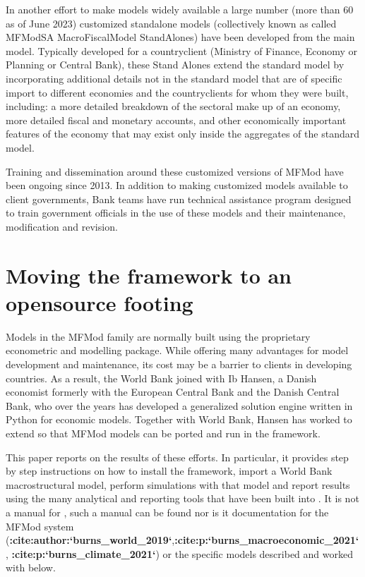 \documentclass[letterpaper,10pt,english]{jupyterBook}
\begin{document}
\sphinxAtStartPar
In another effort to make models widely available a large number (more than 60 as of June 2023) customized stand\sphinxhyphen{}alone models (collectively known as called MFModSA \sphinxhyphen{} MacroFiscalModel StandAlones)  have been developed from the main model. Typically developed for a country\sphinxhyphen{}client (Ministry of Finance, Economy or Planning or Central Bank), these Stand Alones extend the standard model by incorporating additional details not in the standard model that are of specific import to different economies and the country\sphinxhyphen{}clients for whom they were built, including: a more detailed breakdown of the sectoral make up of an economy, more detailed fiscal and monetary accounts, and other economically important features of the economy that may exist only inside the aggregates of the standard model.

\sphinxAtStartPar
Training and dissemination around these customized versions of MFMod have been ongoing since 2013. In addition to making customized models available to client governments, Bank teams have run technical assistance program designed to train government officials in the use of these models and their maintenance, modification and revision.


\section{Moving the framework to an open\sphinxhyphen{}source footing}
\label{\detokenize{content/01_Introduction/Introduction:moving-the-framework-to-an-open-source-footing}}
\sphinxAtStartPar
Models in the MFMod family are normally built using the proprietary  econometric and modelling package. While offering many advantages for model development and maintenance, its cost may be a barrier to clients in developing countries.  As a result, the World Bank joined with Ib Hansen, a Danish economist formerly with the European Central Bank and the Danish Central Bank, who over the years has developed  a generalized solution engine written in Python for economic models. Together with World Bank, Hansen has worked to extend  so that MFMod models can be ported and run in the framework.

\sphinxAtStartPar
This paper reports on the results of these efforts. In particular, it provides step by step instructions on how to install the  framework, import a World Bank macrostructural model,  perform simulations with that model and report results using the many analytical and reporting tools that have been built into .  It is not a manual for , such a manual can be found  nor is it documentation for the MFMod system ({\color{red}\bfseries{}:cite:author:`burns\_world\_2019`},{\color{red}\bfseries{}:cite:p:`burns\_macroeconomic\_2021`}, {\color{red}\bfseries{}:cite:p:`burns\_climate\_2021`}) or the specific models described and worked with below.
\end{document}
